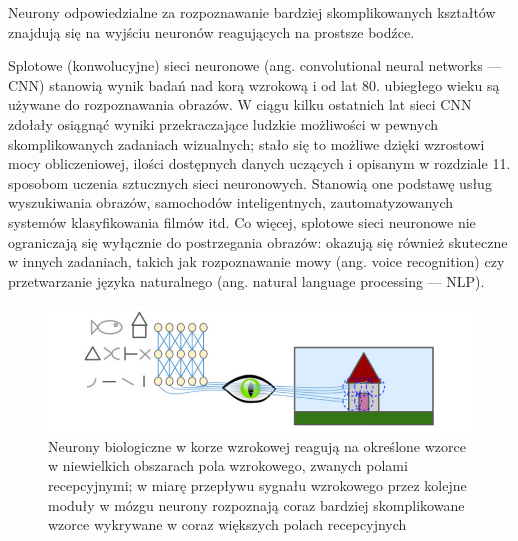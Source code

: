 \documentclass[12pt]{mwbk}
\theoremstyle{plain}
\theoremstyle{definition}
\theoremstyle{remark}
\newcommand\zrodlo[1]{\par\vspace{-3mm}{\small\textit{Źródło: }#1 }}
\begin{document}
Neurony odpowiedzialne za rozpoznawanie bardziej skomplikowanych kształtów znajdują się na wyjściu neuronów reagujących na prostsze bodźce.

\cite{geron}

Splotowe (konwolucyjne) sieci neuronowe (ang. convolutional neural networks — CNN) stanowią
wynik badań nad korą wzrokową i od lat 80. ubiegłego wieku są używane do rozpoznawania obrazów.
W ciągu kilku ostatnich lat sieci CNN zdołały osiągnąć wyniki przekraczające ludzkie możliwości
w pewnych skomplikowanych zadaniach wizualnych; stało się to możliwe dzięki wzrostowi mocy
obliczeniowej, ilości dostępnych danych uczących i opisanym w rozdziale 11. sposobom uczenia
sztucznych sieci neuronowych. Stanowią one podstawę usług wyszukiwania obrazów, samochodów
inteligentnych, zautomatyzowanych systemów klasyfikowania filmów itd. Co więcej, splotowe
sieci neuronowe nie ograniczają się wyłącznie do postrzegania obrazów: okazują się również skuteczne
w innych zadaniach, takich jak rozpoznawanie mowy (ang. voice recognition) czy przetwarzanie
języka naturalnego (ang. natural language processing — NLP).
\begin{figure}[!h]
	\centering
	\includegraphics[width=\linewidth]{rys/kora_wzrokowa.png}
	\caption{Neurony biologiczne w korze wzrokowej reagują na określone wzorce w niewielkich obszarach
		pola wzrokowego, zwanych polami recepcyjnymi; w miarę przepływu sygnału wzrokowego przez kolejne
		moduły w mózgu neurony rozpoznają coraz bardziej skomplikowane wzorce wykrywane w coraz większych
		polach recepcyjnych}
	\zrodlo{\cite{geron}}
	\label{fig:kora-wzrokowa}
\end{figure}
\end{document}
